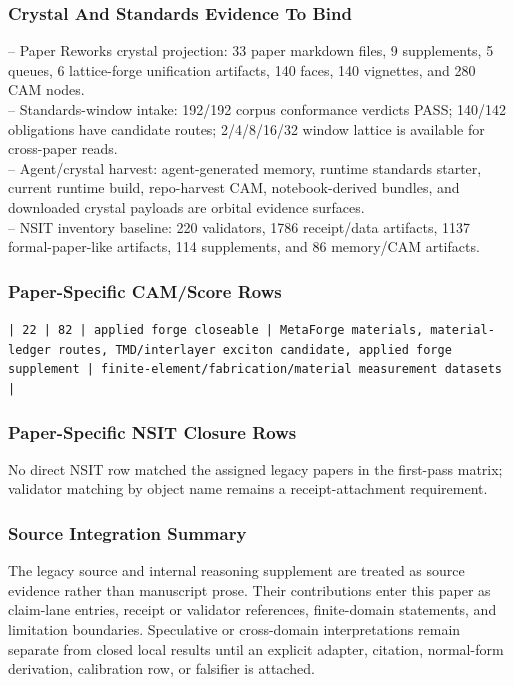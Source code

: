 \documentclass[11pt]{article}
\begin{document}
\subsubsection*{Crystal And Standards Evidence To Bind}

\noindent{}-- Paper Reworks crystal projection: 33 paper markdown files, 9 supplements, 5 queues, 6 lattice-forge unification artifacts, 140 faces, 140 vignettes, and 280 CAM nodes.\\
\noindent{}-- Standards-window intake: 192/192 corpus conformance verdicts PASS; 140/142 obligations have candidate routes; 2/4/8/16/32 window lattice is available for cross-paper reads.\\
\noindent{}-- Agent/crystal harvest: agent-generated memory, runtime standards starter, current runtime build, repo-harvest CAM, notebook-derived bundles, and downloaded crystal payloads are orbital evidence surfaces.\\
\noindent{}-- NSIT inventory baseline: 220 validators, 1786 receipt/data artifacts, 1137 formal-paper-like artifacts, 114 supplements, and 86 memory/CAM artifacts.\\

\subsubsection*{Paper-Specific CAM/Score Rows}

\noindent\texttt{| 22 | 82 | applied forge closeable | MetaForge materials, material-ledger routes, TMD/interlayer exciton candidate, applied forge supplement | finite-element/fabrication/material measurement datasets |}\\

\subsubsection*{Paper-Specific NSIT Closure Rows}

No direct NSIT row matched the assigned legacy papers in the first-pass matrix; validator matching by object name remains a receipt-attachment requirement.

\subsubsection*{Source Integration Summary}

The legacy source and internal reasoning supplement are treated as source
evidence rather than manuscript prose. Their contributions enter this paper as
claim-lane entries, receipt or validator references, finite-domain statements,
and limitation boundaries. Speculative or cross-domain interpretations remain
separate from closed local results until an explicit adapter, citation,
normal-form derivation, calibration row, or falsifier is attached.
\end{document}
